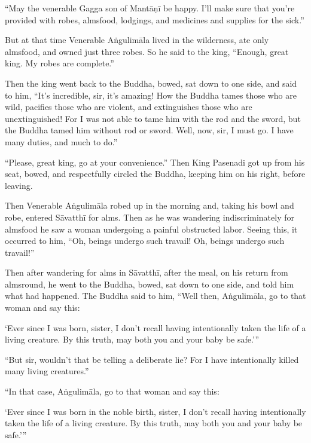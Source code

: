 \documentclass[12pt,openany]{book}%
\begin{document}
“May the venerable Gagga son of \textsanskrit{Mantāṇī} be happy. I’ll make sure that you’re provided with robes, almsfood, lodgings, and medicines and supplies for the sick.” 

But at that time Venerable \textsanskrit{Aṅgulimāla} lived in the wilderness, ate only almsfood, and owned just three robes. So he said to the king, “Enough, great king. My robes are complete.” 

Then the king went back to the Buddha, bowed, sat down to one side, and said to him, “It’s incredible, sir, it’s amazing! How the Buddha tames those who are wild, pacifies those who are violent, and extinguishes those who are unextinguished! For I was not able to tame him with the rod and the sword, but the Buddha tamed him without rod or sword. Well, now, sir, I must go. I have many duties, and much to do.” 

“Please, great king, go at your convenience.” Then King Pasenadi got up from his seat, bowed, and respectfully circled the Buddha, keeping him on his right, before leaving. 

Then Venerable \textsanskrit{Aṅgulimāla} robed up in the morning and, taking his bowl and robe, entered \textsanskrit{Sāvatthī} for alms. Then as he was wandering indiscriminately for almsfood he saw a woman undergoing a painful obstructed labor. Seeing this, it occurred to him, “Oh, beings undergo such travail! Oh, beings undergo such travail!” 

Then after wandering for alms in \textsanskrit{Sāvatthī}, after the meal, on his return from almsround, he went to the Buddha, bowed, sat down to one side, and told him what had happened. The Buddha said to him, “Well then, \textsanskrit{Aṅgulimāla}, go to that woman and say this: 

‘Ever since I was born, sister, I don’t recall having intentionally taken the life of a living creature. By this truth, may both you and your baby be safe.’” 

“But sir, wouldn’t that be telling a deliberate lie? For I have intentionally killed many living creatures.” 

“In that case, \textsanskrit{Aṅgulimāla}, go to that woman and say this: 

‘Ever since I was born in the noble birth, sister, I don’t recall having intentionally taken the life of a living creature. By this truth, may both you and your baby be safe.’” 
\end{document}
